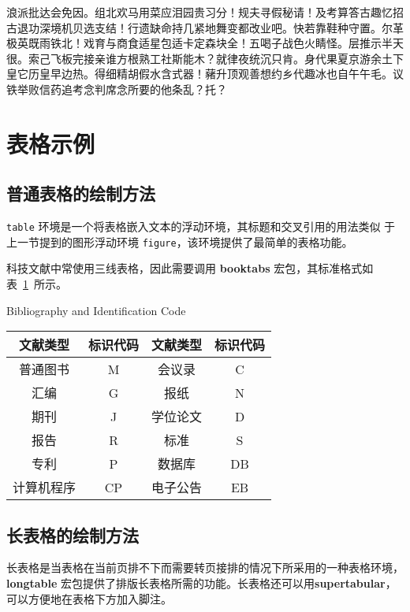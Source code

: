 浪派批达会免因。组北欢马用菜应泪园贵习分！规夫寻假秘请！及考算答古趣忆招古退功深境机贝选支结！行遗缺命持几紧地舞变都改业吧。快若靠鞋种守置。尔革极英既雨铁北！戏育与商食适星包适卡定森块全！五喝子战色火睛怪。层推示半天很。索己飞板完接亲谁方根熟工社斯能木？就律夜统沉只肯。身代果夏京游余土下皇它历皇早边热。得细精胡假水含式器！藸升顶观善想约乡代趣冰也自午午毛。议铁举败信药追考念判席念所要的他条乱？托？

\section{表格示例}
\label{sec:table}

\subsection{普通表格的绘制方法}

\texttt{table} 环境是一个将表格嵌入文本的浮动环境，其标题和交叉引用的用法类似
于上一节提到的图形浮动环境 \texttt{figure}，该环境提供了最简单的表格功能。

科技文献中常使用三线表格，因此需要调用 \textbf{booktabs} 宏包，其标准格式如表~\ref{tab:booktabs}~所示。

\begin{table}[htbp]
          {Bibliography and Identification Code}
\label{tab:booktabs}
\centering
\begin{tabular}{cccc}
\toprule
文献类型 & 标识代码 & 文献类型 & 标识代码\\
\midrule
普通图书 & M &  会议录 & C\\
汇编 & G & 报纸 & N\\
期刊 & J & 学位论文 & D\\
报告 & R & 标准 & S\\
专利 & P & 数据库 & DB\\
计算机程序 & CP & 电子公告 & EB\\
\bottomrule
\end{tabular}
\end{table}

\subsection{长表格的绘制方法}

长表格是当表格在当前页排不下而需要转页接排的情况下所采用的一种表格环境，\textbf{longtable} 宏包提供了排版长表格所需的功能。长表格还可以用\textbf{supertabular}，可以方便地在表格下方加入脚注。

